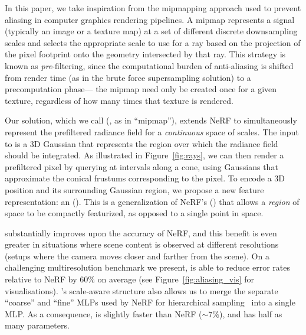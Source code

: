 \documentclass[10pt,twocolumn,letterpaper]{article}
\begin{document}
In this paper, we take inspiration from the mipmapping approach used to prevent aliasing in computer graphics rendering pipelines. A mipmap represents a signal (typically an image or a texture map) at a set of different discrete downsampling scales and selects the appropriate scale to use for a ray based on the projection of the pixel footprint onto the geometry intersected by that ray. This strategy is known as \emph{pre}-filtering, since the computational burden of anti-aliasing is shifted from render time (as in the brute force supersampling solution) to a precomputation phase--- the  mipmap need only be created once for a given texture, regardless of how many times that texture is rendered.

Our solution, which we call \shortmodelnamelower (\longmodelname, as in ``mipmap''), extends NeRF to simultaneously represent the prefiltered radiance field for a \emph{continuous} space of scales. The input to \shortmodelnamelower is a 3D Gaussian that represents the region over which the radiance field should be integrated. As illustrated in Figure~\ref{fig:rays}, we can then render a prefiltered pixel by querying \shortmodelnamelower at intervals along a cone, using Gaussians that approximate the conical frustums corresponding to the pixel. To encode a 3D position and its surrounding Gaussian region, we propose a new feature representation: an \featurename (\shortfeaturename). This is a generalization of NeRF's \posenc (\shortposenc) that allows a \emph{region} of space to be compactly featurized, as opposed to a single point in space.

\shortmodelname substantially improves upon the accuracy of NeRF, and this benefit is even greater in situations where scene content is observed at different resolutions (\ie setups where the camera moves closer and farther from the scene).
On a challenging multiresolution benchmark we present, \shortmodelnamelower is able to reduce error rates relative to NeRF by $60\%$ on average (see Figure~\ref{fig:aliasing_vis} for visualisations).
\shortmodelname's scale-aware structure also allows us to merge the separate ``coarse'' and ``fine'' MLPs used by NeRF for hierarchical sampling~\cite{mildenhall2020} into a single MLP. As a consequence, \shortmodelnamelower is slightly faster than NeRF ($\sim 7\%$), and has half as many parameters.


\newcommand{\aliasimage}[2]{
	\begin{overpic}[width=0.78in]{figures/aliasing2/#1}
	\put (48,2) {\scriptsize #2}
    \end{overpic}
}
\end{document}
